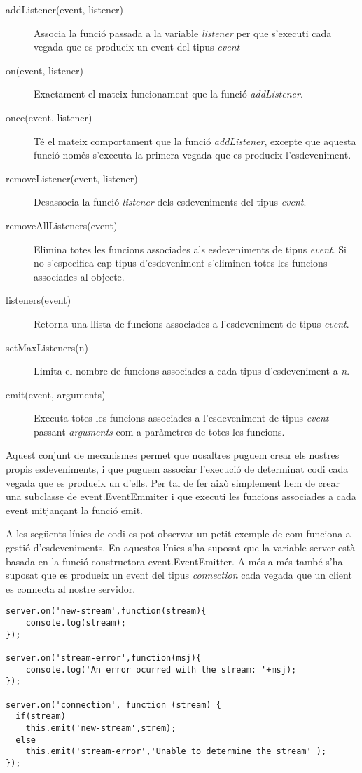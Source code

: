 \begin{description}
    \item[addListener(event, listener)]{ Associa la funció passada a la variable \emph{listener} per que s'executi cada vegada que es produeix un event del tipus \emph{event}}
    \item[on(event, listener)] { Exactament el mateix funcionament que la funció \emph{addListener}.}
    \item[once(event, listener)] {Té el mateix comportament que la funció \emph{addListener}, excepte que aquesta funció només s'executa la primera vegada que es produeix l'esdeveniment.}
    \item[removeListener(event, listener)]{ Desassocia la funció \emph{listener} dels esdeveniments del tipus \emph{event}.}
    \item[removeAllListeners(event)] {Elimina totes les funcions associades als esdeveniments de tipus \emph{event}. Si no s'especifica cap tipus d'esdeveniment s'eliminen totes les funcions associades al objecte.}
    \item[listeners(event)] { Retorna una llista de funcions associades a l'esdeveniment de tipus \emph{event}.}
    \item[setMaxListeners(n)] {Limita el nombre de funcions associades a cada tipus d'esdeveniment a \emph{n}.}
    \item[emit(event, arguments)] { Executa totes les funcions associades a l'esdeveniment de tipus \emph{event} passant \emph{arguments} com a paràmetres de totes les funcions.}
\end{description}

Aquest conjunt de mecanismes permet que nosaltres puguem crear els nostres propis esdeveniments, i que puguem associar l'execució de determinat codi cada vegada que es produeix un d'ells. Per tal de fer això simplement hem de crear una subclasse de event.EventEmmiter i que executi les funcions associades a cada event mitjançant la funció emit. 

A les següents línies de codi es pot observar un petit exemple de com funciona a gestió d'esdeveniments. En aquestes línies s'ha suposat que la variable server està basada en la funció constructora event.EventEmitter. A més a més també s'ha suposat que es produeix un event del tipus \emph{connection} cada vegada que un client es connecta al nostre servidor. 

\begin{lstlisting}
server.on('new-stream',function(stream){
    console.log(stream);
});

server.on('stream-error',function(msj){
    console.log('An error ocurred with the stream: '+msj);
});

server.on('connection', function (stream) {
  if(stream) 
    this.emit('new-stream',strem);
  else
    this.emit('stream-error','Unable to determine the stream' );
});
\end{lstlisting}

